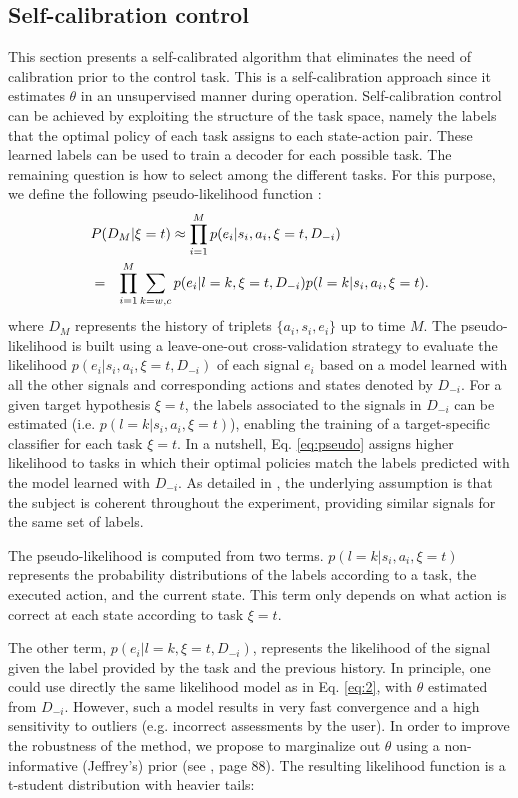 \subsection{Self-calibration control}
\label{sec:zerocalibration}
%
This section presents a self-calibrated algorithm that eliminates the need of  calibration prior to the control task. This is a self-calibration approach since it estimates $\theta$ in an unsupervised manner during operation.
%
Self-calibration control can be achieved by exploiting the structure of the task space, namely the  labels that the optimal policy of each task assigns to each state-action pair. These learned labels can be used to train a decoder for each possible task. The remaining question is how to select among the different tasks. For this purpose, we define the following pseudo-likelihood function \cite{grizou2014interactive}:
%
\begin{eqnarray}\label{eq:pseudo1}
\lefteqn{P(D_M | \xi=t) \approx \prod_{i=1}^M p(e_i | s_i, a_i, \xi=t, D_{-i})}  \\ \label{eq:pseudo2}
&=& \prod_{i=1}^M \sum_{k=w,c}  p(e_i | l=k, \xi=t, D_{-i})  p(l=k | s_i,a_i, \xi=t).
\label{eq:pseudo}
\end{eqnarray}
%
where $D_M$ represents the history of triplets $\{a_i, s_i, e_i\}$ up to time $M$.
The pseudo-likelihood is built using a leave-one-out cross-validation strategy to evaluate the likelihood $p(e_i | s_i, a_i, \xi=t, D_{-i})$ of each signal $e_i$ based on a model learned with all the other signals and corresponding actions and states denoted by $D_{-i}$. For a given target hypothesis $\xi=t$, the labels associated to the signals in $D_{-i}$ can be estimated (i.e. $p(l=k | s_i,a_i, \xi=t)$), enabling the training of a target-specific classifier for each task $\xi=t$. In a nutshell, Eq. \ref{eq:pseudo} assigns higher likelihood to tasks in which their optimal policies match the labels predicted with the model learned with $D_{-i}$. As detailed in \cite{grizou2014interactive}, the underlying assumption is that the subject is coherent throughout the experiment, providing similar signals for the same set of labels.

The pseudo-likelihood is computed from two terms. $p(l=k|s_i,a_i,\xi=t)$ represents the probability distributions of the labels according to a task, the executed action, and the current state. This term only depends on what action is correct at each state according to task $\xi=t$.

The other term, $p(e_i | l=k,\xi=t, D_{-i})$, represents the likelihood of the signal given the label provided by the task and the previous history. In principle, one could use directly the same likelihood model as in Eq. \ref{eq:2}, with $\theta$ estimated from $D_{-i}$. However, such a model results in very fast convergence and a high sensitivity to outliers (e.g. incorrect assessments by the user). In order to improve the robustness of the method, we propose to marginalize out $\theta$  using a non-informative (Jeffrey's) prior (see \cite{gelman2003bayesian}, page 88). The resulting likelihood function is a t-student distribution with heavier tails:

